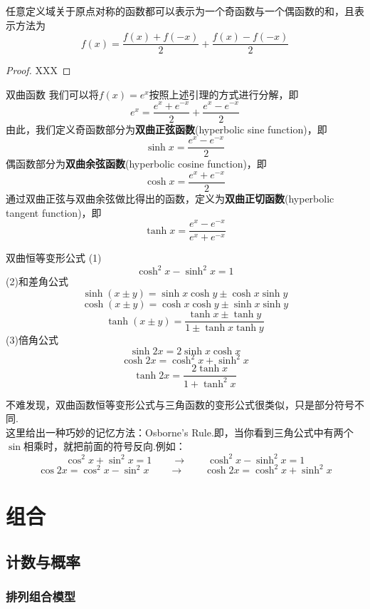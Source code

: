 \documentclass[lang=cn, zihao=5]{elegantbook}
\begin{document}
\begin{lemma}
    任意定义域关于原点对称的函数都可以表示为一个奇函数与一个偶函数的和，且表示方法为$$f(x)=\frac{f(x)+f(-x)}{2}+\frac{f(x)-f(-x)}{2}$$
\end{lemma}
\begin{proof}
    XXX
\end{proof}

\begin{definition}{双曲函数}
    我们可以将$f(x)=e^x$按照上述引理的方式进行分解，即$$e^x=\frac{e^x+e^{-x}}{2}+\frac{e^x-e^{-x}}{2}$$
    由此，我们定义奇函数部分为\textbf{双曲正弦函数}(hyperbolic sine function)，即$$\sinh{x}=\frac{e^x-e^{-x}}{2}$$
    偶函数部分为\textbf{双曲余弦函数}(hyperbolic cosine function)，即$$\cosh{x}=\frac{e^x+e^{-x}}{2}$$
    通过双曲正弦与双曲余弦做比得出的函数，定义为\textbf{双曲正切函数}(hyperbolic tangent function)，即$$\tanh{x}=\frac{e^x-e^{-x}}{e^x+e^{-x}}$$
\end{definition}

\begin{proposition}{双曲恒等变形公式}
    (1)$$\cosh^2{x}-\sinh^2{x}=1$$
    (2)和差角公式
    $$\sinh{(x \pm y)}=\sinh{x}\cosh{y} \pm \cosh{x}\sinh{y}$$
    $$\cosh{(x \pm y)}=\cosh{x}\cosh{y} \pm \sinh{x}\sinh{y}$$
    $$\tanh{(x \pm y)}=\frac{\tanh{x} \pm \tanh{y}}{1 \pm \tanh{x}\tanh{y}}$$
    (3)倍角公式
    $$\sinh{2x}=2\sinh{x}\cosh{x}$$
    $$\cosh{2x}=\cosh^2{x}+\sinh^2{x}$$
    $$\tanh{2x}=\frac{2\tanh{x}}{1+\tanh^2{x}}$$
\end{proposition}
\begin{remark}
    不难发现，双曲函数恒等变形公式与三角函数的变形公式很类似，只是部分符号不同.\\
    这里给出一种巧妙的记忆方法：Osborne's Rule.即，当你看到三角公式中有两个$\sin$相乘时，就把前面的符号反向.例如：$$\cos^2{x}+\sin^2{x}=1 \qquad \longrightarrow \qquad \cosh^2{x}-\sinh^2{x}=1$$
    $$\cos{2x}=\cos^2{x}-\sin^2{x} \qquad \longrightarrow \qquad \cosh{2x}=\cosh^2{x}+\sinh^2{x}$$
\end{remark}

\part{组合}

\chapter{计数与概率}

\section{排列组合模型}
\end{document}
